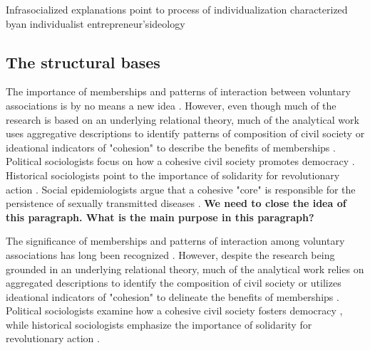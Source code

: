 Infrasocialized explanations point to process of individualization characterized byan individualist entrepreneur'sideology

\subsection{The structural bases}

The importance of memberships and patterns of interaction between voluntary associations is by no means a new idea \parencite{diani_cement_2015, sorenson_when_2014}. However, even though much of the research is based on an underlying relational theory, much of the analytical work uses aggregative descriptions to identify patterns of composition of civil society \parencite{salamon_social_1998} or ideational indicators of "cohesion" to describe the benefits of memberships \parencite{paxton_social_2002, paxton_association_2007,putnam_making_1994}. Political sociologists focus on how a cohesive civil society promotes democracy \parencite{paxton_is_1999, putnam_bowling_2000}.  Historical sociologists point to the importance of solidarity for revolutionary action \parencite{bearman_structure_1993, gould_multiple_1991}. Social epidemiologists argue that a cohesive "core" is responsible for the persistence of sexually transmitted diseases \parencite{rothenberg_personal_1996}. \textbf{We need to close the idea of this paragraph. What is the main purpose in this paragraph?}


\bigskip

{\color{blue} The significance of memberships and patterns of interaction among voluntary associations has long been recognized \parencite{diani_cement_2015, sorenson_when_2014}. However, despite the research being grounded in an underlying relational theory, much of the analytical work relies on aggregated descriptions to identify the composition of civil society \parencite{salamon_social_1998} or utilizes ideational indicators of "cohesion" to delineate the benefits of memberships \parencite{paxton_social_2002, paxton_association_2007,putnam_making_1994}. Political sociologists examine how a cohesive civil society fosters democracy \parencite{paxton_is_1999, putnam_bowling_2000}, while historical sociologists emphasize the importance of solidarity for revolutionary action \parencite{bearman_structure_1993, gould_multiple_1991}.}


\bigskip

